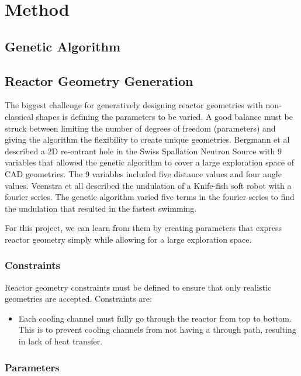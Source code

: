 \section{Method}

\subsection{Genetic Algorithm}

\subsection{Reactor Geometry Generation}
The biggest challenge for generatively designing reactor geometries with 
non-classical shapes is defining the parameters to be varied. 
A good balance must be struck between limiting the number of degrees of freedom 
(parameters) and giving the algorithm the flexibility to create unique geometries. 
Bergmann et al \cite{bergmann_simulation_2018} described a 2D re-entrant hole 
in the Swiss Spallation Neutron Source with 9 variables that allowed the genetic 
algorithm to cover a large exploration space of CAD geometries. 
The 9 variables included five distance values and four angle values. 
Veenstra et all \cite{veenstra_evolution_2018} described the undulation of 
a Knife-fish soft robot with a fourier series. 
The genetic algorithm varied five terms in the fourier series to find the undulation 
that resulted in the fastest swimming. 

For this project, we can learn from them by creating parameters that
express reactor geometry simply while allowing for a large exploration space. 

\subsubsection{Constraints}
Reactor geometry constraints must be defined to ensure that only realistic 
geometries are accepted. 
Constraints are: 
\begin{itemize}
    \item Each cooling channel must fully go through the reactor from top to 
    bottom. This is to prevent cooling channels from not having a through 
    path, resulting in lack of heat transfer. 
\end{itemize}

\subsubsection{Parameters}

